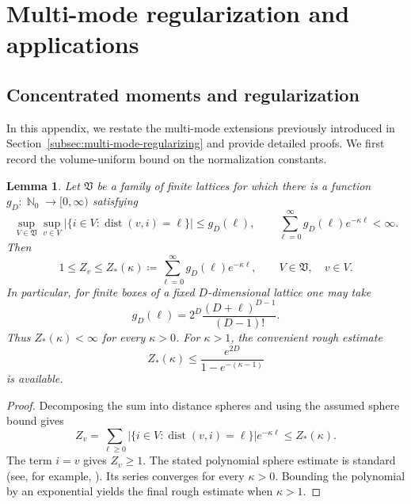 \documentclass[11pt]{article}
\theoremstyle{myplain}
\newtheorem{lem}[lem]{Lemma}
\theoremstyle{mydefinition}
\theoremstyle{remark}
\DeclareMathOperator{\N}{\mathbb{N}}
\DeclareMathOperator{\dist}{dist}
\DeclareMathOperator{\1}{\mathds{1}}
\begin{document}
\section{Multi-mode regularization and applications}\label{appx:multi-mode-extension}
    \subsection{Concentrated moments and regularization}

        In this appendix, we restate the multi-mode extensions previously introduced in Section~\ref{subsec:multi-mode-regularizing} and provide detailed proofs. We first record the volume-uniform bound on the normalization constants.
        \begin{lem}\label{appx-lem:normalization-bounds}
            Let $\mathfrak V$ be a family of finite lattices for which there is a function $g_D:\N_0\to[0,\infty)$ satisfying
            \begin{equation*}
                \sup_{V\in\mathfrak V}\sup_{v\in V}
                |\{i\in V:\dist(v,i)=\ell\}|
                \leq g_D(\ell),
                \qquad
                \sum_{\ell=0}^{\infty}g_D(\ell)e^{-\kappa\ell}<\infty .
            \end{equation*}
            Then
            \begin{equation}\label{appx-eq:uniform-normalization-bound}
                1\leq Z_v\leq
                Z_*(\kappa)\coloneqq
                \sum_{\ell=0}^{\infty}g_D(\ell)e^{-\kappa\ell},
                \qquad V\in\mathfrak V,\quad v\in V.
            \end{equation}
            In particular, for finite boxes of a fixed $D$-dimensional lattice one may take
            \begin{equation*}
                g_D(\ell)=
                2^D\frac{(D+\ell)^{D-1}}{(D-1)!}.
            \end{equation*}
            Thus $Z_*(\kappa)<\infty$ for every $\kappa>0$. For $\kappa>1$, the convenient rough estimate
            \begin{equation*}
                Z_*(\kappa)\leq
                \frac{e^{2D}}{1-e^{-(\kappa-1)}}
            \end{equation*}
            is available.
        \end{lem}
        \begin{proof}
            Decomposing the sum into distance spheres and using the assumed sphere bound gives
            \begin{equation*}
                Z_v
                =\sum_{\ell\geq0}
                |\{i\in V:\dist(v,i)=\ell\}|e^{-\kappa\ell}
                \leq Z_*(\kappa).
            \end{equation*}
            The term $i=v$ gives $Z_v\geq1$. The stated polynomial sphere estimate is standard (see, for example, \cite[Eq.~(B2)]{Moebus.2025Stability}). Its series converges for every $\kappa>0$. Bounding the polynomial by an exponential yields the final rough estimate when $\kappa>1$.
        \end{proof}
\end{document}
